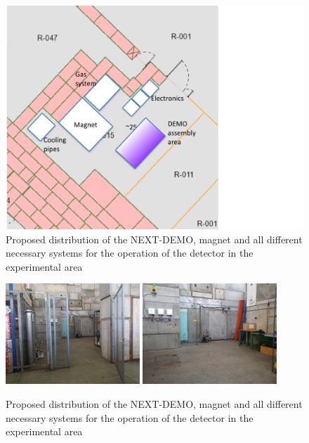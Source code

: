 \begin{figure}
\centering
\includegraphics[angle=0,width=\textwidth]{img/distribution_examples.pdf}
\caption{Proposed distribution of the NEXT-DEMO, magnet and all different necessary systems for the operation of the detector in the experimental area} \label{fig:Distribution2}
\end{figure}


\begin{figure}
\centering
\includegraphics[width=0.45\textwidth]{img/experimentalarea1.jpeg}
\includegraphics[angle=0,width=0.45\textwidth]{img/experimentalarea2.jpeg}
\caption{Proposed distribution of the NEXT-DEMO, magnet and all different necessary systems for the operation of the detector in the experimental area} \label{fig:pictures}
\end{figure}


